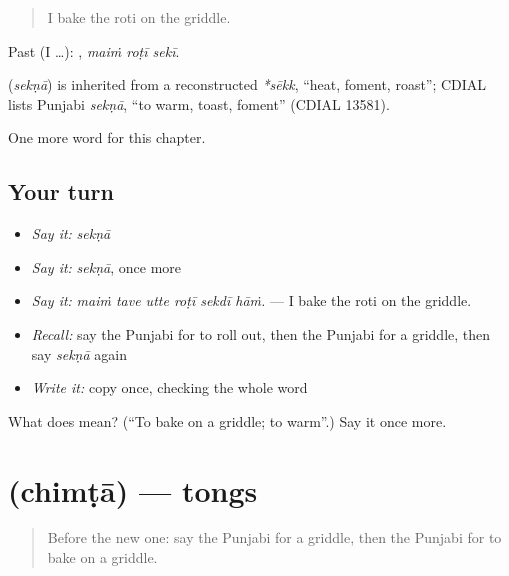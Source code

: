 \begin{quote}
I bake the roti on the griddle.
\end{quote}

Past (I …):   , \emph{maiṁ roṭī sekī}.

\begin{cousinweb}
\textbf{} (\emph{sekṇā}) is inherited from a reconstructed \emph{*sēkk}, \textquotedblleft{}heat, foment, roast\textquotedblright{}; CDIAL lists Punjabi \emph{sekṇā}, \textquotedblleft{}to warm, toast, foment\textquotedblright{} (CDIAL 13581).
\end{cousinweb}

\begin{grammarlens}[title={What you've built}]
One more word for this chapter.
\end{grammarlens}

\subsection*{Your turn}
\begin{itemize}
\raggedright
  \item \emph{Say it:} \emph{sekṇā}
  \item \emph{Say it:} \emph{sekṇā}, once more
  \item \emph{Say it:} \emph{maiṁ tave utte roṭī sekdī hāṁ.} — I bake the roti on the griddle.
  \item \emph{Recall:} say the Punjabi for to roll out, then the Punjabi for a griddle, then say \emph{sekṇā} again
  \item \emph{Write it:} copy \textbf{} once, checking the whole word
\end{itemize}

\begin{tcolorbox}[breakable,colback=teal!4,colframe=teal!35!black,title={Before you move on}]
What does  mean? (\textquotedblleft{}To bake on a griddle; to warm\textquotedblright{}.) Say it once more.
\end{tcolorbox}
\section[\texorpdfstring{\pa{ਚਿਮਟਾ} (chimṭā)}{ਚਿਮਟਾ (chimṭā)}]{ (chimṭā) — tongs}

\label{lesson:PA-C239-chimta}



\begin{quote}
Before the new one: say the Punjabi for a griddle, then the Punjabi for to bake on a griddle.
\end{quote}

